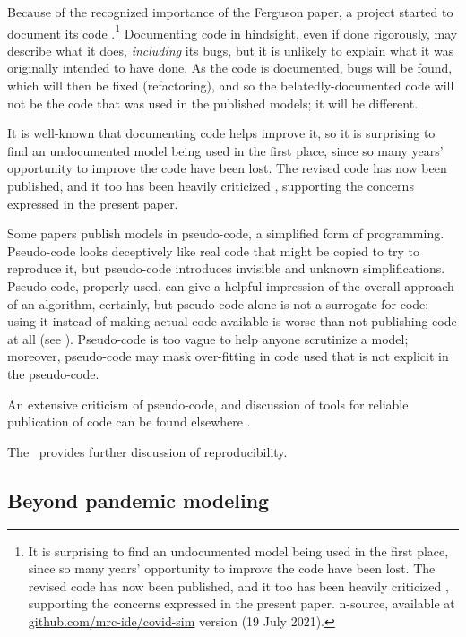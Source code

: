 \documentclass{comjnl}
\begin{document}
Because of the recognized importance of the Ferguson paper, a project started to document its code  \cite{refactoring}.\footnote{It is surprising to find an undocumented model being used in the first place, since so many years' opportunity to improve the code have been lost. The revised code has now been published, and it too has been heavily criticized , supporting the concerns expressed in the present paper.
n-source, available at \url{github.com/mrc-ide/covid-sim} version (19 July 2021).} Documenting code in hindsight, even if done rigorously, may describe what it does, \emph{including\/} its bugs, but it is unlikely to explain what it was originally intended to have done. As the code is documented, bugs will be found, which will then be fixed (refactoring), and so the belatedly-documented code will not be the code that was used in the published models; it will be different. 

It is well-known that documenting code helps improve it, so it is surprising to find an undocumented model being used in the first place, since so many years' opportunity to improve the code have been lost. The revised code has now been published, and it too has been heavily criticized , supporting the concerns expressed in the present paper.

Some papers  publish models in pseudo-code, a simplified form of programming. Pseudo-code looks deceptively like real code that might be copied to try to reproduce it, but pseudo-code introduces invisible and unknown simplifications. Pseudo-code, properly used, can give a helpful impression of the overall approach of an algorithm, certainly, but pseudo-code alone is not a surrogate for code: using it instead of making actual code available is worse than not publishing code at all (see \cite{chinese}). Pseudo-code is too vague to help anyone scrutinize a model; moreover, pseudo-code may mask over-fitting in code used that is not explicit in the pseudo-code. 

An extensive criticism of pseudo-code, and discussion of tools for reliable publication of code can be found elsewhere \cite{relit}. 

The \supplement\ provides further discussion of reproducibility.

\subsection{Beyond pandemic modeling}
\label{section-science-beyond-pandemic-modeling}
\end{document}
